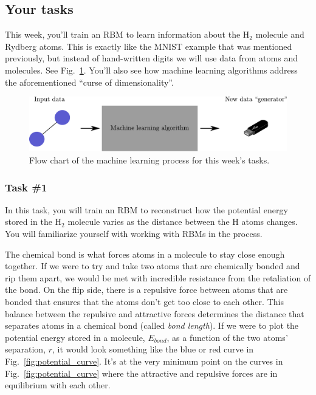 \documentclass[12pt]{article}
\begin{document}
\subsection*{Your tasks} \label{sec:tasks}

This week, you'll train an RBM to learn information about the H$_2$ molecule and Rydberg atoms. This is exactly like the MNIST example that was mentioned previously, but instead of hand-written digits we will use data from atoms and molecules. See Fig.~\ref{fig:H2_ML}. You'll also see how machine learning algorithms address the aforementioned ``curse of dimensionality''.

\begin{figure}
    \begin{center}
        \includegraphics[width=\linewidth]{../figures/H2_ML.pdf}
    \end{center}
    \caption{Flow chart of the machine learning process for this week's tasks.}
    \label{fig:H2_ML}
\end{figure}

\subsubsection*{Task \#1}

In this task, you will train an RBM to reconstruct how the potential energy stored in the H$_2$ molecule varies as the distance between the H atoms changes. You will familiarize yourself with working with RBMs in the process. 

The chemical bond is what forces atoms in a molecule to stay close enough together. If we were to try and take two atoms that are chemically bonded and rip them apart, we would be met with incredible resistance from the retaliation of the bond. On the flip side, there is a repulsive force between atoms that are bonded that ensures that the atoms don't get too close to each other. This balance between the repulsive and attractive forces determines the distance that separates atoms in a chemical bond (called \textit{bond length}). If we were to plot the potential energy stored in a molecule, $E_{bond}$, as a function of the two atoms' separation, $r$, it would look something like the blue or red curve in Fig.~\ref{fig:potential_curve}. It's at the very minimum point on the curves in Fig.~\ref{fig:potential_curve} where the attractive and repulsive forces are in equilibrium with each other.
\end{document}
